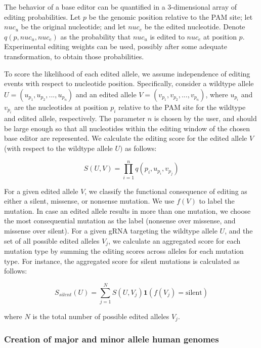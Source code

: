 \documentclass[pdftex,english,10pt]{article}
\begin{document}
{The behavior of a base editor can be quantified in a 3-dimensional array of editing probabilities. Let $p$ be the genomic position relative to the PAM site; let $nuc_u$ be the original nucleotide; and let $nuc_e$ be the edited nucleotide. Denote $q(p, nuc_u, nuc_e)$ as the probability that $nuc_u$ is edited to $nuc_e$ at position $p$. Experimental editing weights can be used, possibly after some adequate transformation, to obtain those probabilities. 

To score the likelihood of each edited allele, we assume independence of editing events with respect to nucleotide position. Specifically, consider a wildtype allele $U=(u_{p_1}, u_{p_2}, ..., u_{p_n})$ and an edited allele $V=(v_{p_1}, v_{p_2}, ..., v_{p_n})$, where $u_{p_i}$  and $v_{p_i}$ are the nucleotides at position $p_i$ relative to the PAM site for the wildtype and edited allele, respectively. The parameter $n$ is chosen by the user, and should be large enough so that all nucleotides within the editing window of the chosen base editor are represented.  We calculate the editing score for the edited allele $V$ (with respect to the wildtype allele $U)$ as follows:

\begin{equation}
S(U,V) = \prod_{i=1}^n q({p_i}, u_{p_i}, v_{p_j})
\end{equation}

For a given edited allele $V$, we classify the functional consequence of editing as either a silent, missense, or nonsense mutation. We use $f(V)$ to label the mutation. In case an edited allele results in more than one mutation, we choose the most consequential mutation as the label (nonsense over missense, and missense over silent). For a given gRNA targeting the wildtype allele $U$,  and the set of all possible edited alleles ${V_j}$, we calculate an aggregated score for each mutation type by summing the editing scores across alleles for each mutation type. For instance, the aggregated score for silent mutations is calculated as follows:

\begin{equation}
S_{silent}(U) = \sum_{j=1}^N S(U,V_j) \mathbf{1}(f(V_j)=\text{silent})
\end{equation}

where $N$ is the total number of possible edited alleles $V_j$. 



\subsubsection*{Creation of major and minor allele human genomes}

}
\end{document}

